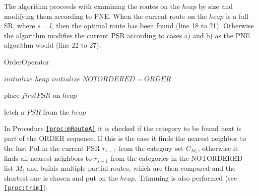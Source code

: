The algorithm proceeds with examining the routes on the $heap$ by size and modifying them according to PNE. When the current route on the $heap$ is a full SR, where $s = l$, then the optimal route has been found (line 18 to 21). Otherwise the algorithm modifies the current PSR according to cases a) and b) as the PNE algorithm would (line 22 to 27). \newline

\begin{algorithm}[H]
\caption{OrderOperator}
\label{alg:order}
	
	
	\BlankLine
	
	$initialize$ $heap$\;
	$initialize$ $NOTORDERED = \overline{ORDER}$\;
	
	\BlankLine
	
	place $firstPSR$ on $heap$\;
	
	
	\BlankLine
	
	
	fetch a $PSR$ from the $heap$\;

\end{algorithm}

\pagebreak

In Procedure \texttt{\ref{proc:mRouteA}} it is checked if the category to be found next is part of the ORDER sequence. If this is the case it finds the nearest neighbor to the last PoI in the current PSR $r_{s-1}$ from the category set $C_{M_{s}}$, otherwise it finds all nearest neighbors to $r_{s-1}$ from the categories in the NOTORDERED list $M_{i}$ and builds multiple partial routes, which are then compared and the shortest one is chosen and put on the $heap$.
Trimming is also performed (see \texttt{\ref{proc:trim}}).\newline

